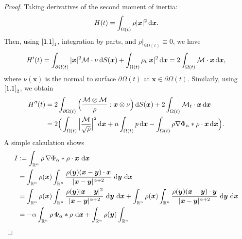 \documentclass[reqno,11pt]{amsart}
\numberwithin{equation}{section}
\theoremstyle{definition}
\def\dd{{\, \rm d}}
\begin{document}
\begin{proof}
    Taking derivatives of the second moment of inertia:
\begin{equation}\label{3.1a}
H(t)=\int_{\Omega(t)}\rho|\boldsymbol{x}|^2\dd \boldsymbol{x}.
\end{equation}
Then, using $\eqref{1.1}_1$, integration by parts, 
and $\rho |_{\partial \Omega(t)} \equiv 0$, we have
 $$H'(t)= \int_{\partial \Omega(t)} |\boldsymbol{x}|^2 \mathcal{M} \cdot \nu \dd S(\boldsymbol{x}) + \int_{\Omega(t)}\rho_t|\boldsymbol{x}|^2\dd \boldsymbol{x} = 2\int_{\Omega(t)}\mathcal{M} \cdot \boldsymbol{x}\dd \boldsymbol{x},$$
where $\nu(\boldsymbol{x})$ is the normal to surface $\partial \Omega(t)$ 
at $\boldsymbol{x} \in \partial \Omega(t)$. 
Similarly, using $\eqref{1.1}_2$, we obtain
 \begin{equation}\label{2.2}
 \begin{split}
 H''(t)& =2\int_{\partial \Omega(t)} \Big( \frac{\mathcal{M} \otimes \mathcal{M}}{\rho} : \boldsymbol{x}\otimes \nu \Big) \dd S(\boldsymbol{x}) + 2\int_{\Omega(t)}\mathcal{M}_t \cdot \boldsymbol{x}\dd \boldsymbol{x} \\
 & = 2\Big(\int_{\Omega(t)}\Big| \frac{\mathcal{M}}{\sqrt{\rho}} \Big|^2\dd \boldsymbol{x}
 +n\int_{\Omega(t)}p\dd \boldsymbol{x}-\int_{\Omega(t)}\rho\nabla\Phi_\alpha\ast\rho\cdot \boldsymbol{x}\dd \boldsymbol{x}\Big).
 \end{split}
 \end{equation}
A simple calculation shows 
 \begin{align*}\nonumber
 I&:=\int_{\mathbb{R}^n}\rho\,\nabla\Phi_\alpha\ast\rho\cdot \boldsymbol{x}\,\dd \boldsymbol{x}\\
&=\int_{\mathbb{R}^n}\rho(\boldsymbol{x})\int_{\mathbb{R}^n}
\frac{\rho(\boldsymbol{y})(\boldsymbol{x}-\boldsymbol{y})\cdot \boldsymbol{x}}
{|\boldsymbol{x}-\boldsymbol{y}|^{\alpha+2}}
\,\dd \boldsymbol{y}\,\dd \boldsymbol{x}\\
&=\int_{\mathbb{R}^n}\rho(\boldsymbol{x})\int_{\mathbb{R}^n}
\frac{\rho(\boldsymbol{y})|\boldsymbol{x}-\boldsymbol{y}|^2}
{|\boldsymbol{x}-\boldsymbol{y}|^{\alpha+2}}
\,\dd \boldsymbol{y}\,\dd \boldsymbol{x}
+\int_{\mathbb{R}^n}\rho(\boldsymbol{x})\int_{\mathbb{R}^n}
\frac{\rho(\boldsymbol{y})(\boldsymbol{x}-\boldsymbol{y})\cdot \boldsymbol{y}}
{|\boldsymbol{x}-\boldsymbol{y}|^{\alpha+2}}
\,\dd \boldsymbol{y}\,\dd \boldsymbol{x}\\
&=-\alpha\int_{\mathbb{R}^n}\rho\,\Phi_\alpha\ast\rho\,\dd \boldsymbol{x}
+\int_{\mathbb{R}^n}\rho(\boldsymbol{y})\int_{\mathbb{R}^n}

\end{align*}
\end{proof}
\end{document}
